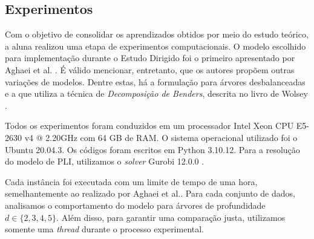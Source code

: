 \documentclass[12pt,a4paper]{article}
\begin{document}
\subsection{Experimentos}

Com o objetivo de consolidar os aprendizados obtidos por meio do estudo teórico, a aluna realizou uma etapa de experimentos computacionais.
O modelo escolhido para implementação durante o Estudo Dirigido foi o primeiro apresentado por Aghaei et al. \cite{Aghaei24}.
É válido mencionar, entretanto, que os autores propõem outras variações de modelos. Dentre estas, há a formulação para árvores desbalanceadas
e a que utiliza a técnica de \emph{Decomposição de Benders}, descrita no livro de Wolsey \cite{Wolsey2021}.

Todos os experimentos foram conduzidos em um processador Intel Xeon CPU E5-2630 v4 @ 2.20GHz
com 64 GB de RAM. O sistema operacional utilizado foi o Ubuntu 20.04.3. Os códigos foram 
escritos em Python 3.10.12. Para a resolução do modelo de PLI, utilizamos o \emph{solver}
Gurobi 12.0.0 \cite{Gurobi}. 

Cada instância foi executada com um limite de tempo de uma hora, semelhantemente ao realizado por
Aghaei et al.\cite{Aghaei24}. Para cada conjunto de dados, analisamos o comportamento do modelo para árvores de profundidade $d \in \{2, 3, 4, 5\}$. Além disso, para garantir uma comparação justa, utilizamos somente uma \emph{thread} durante o processo experimental.
\end{document}

